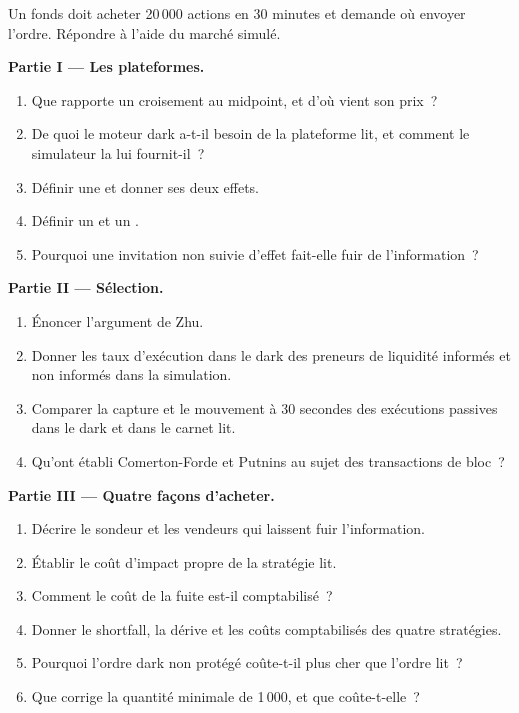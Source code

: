 \begin{problem}\label{pb:mx:dark-pools-and-blocks:1}
Un fonds doit acheter 20\,000 actions en 30 minutes et demande où envoyer l'ordre. Répondre à l'aide du marché simulé.

\medskip\noindent\textbf{Partie I --- Les plateformes.}
\begin{enumerate}
\item Que rapporte un croisement au midpoint, et d'où vient son prix~?
\item De quoi le moteur dark a-t-il besoin de la plateforme lit, et comment le simulateur la lui fournit-il~?
\item Définir une  et donner ses deux effets.
\item Définir un  et un .
\item Pourquoi une invitation non suivie d'effet fait-elle fuir de l'information~?
\end{enumerate}

\medskip\noindent\textbf{Partie II --- Sélection.}
\begin{enumerate}[resume]
\item Énoncer l'argument de Zhu.
\item Donner les taux d'exécution dans le dark des preneurs de liquidité informés et non informés dans la simulation.
\item Comparer la capture et le mouvement à 30 secondes des exécutions passives dans le dark et dans le carnet lit.
\item Qu'ont établi Comerton-Forde et Putnins au sujet des transactions de bloc~?
\end{enumerate}

\medskip\noindent\textbf{Partie III --- Quatre façons d'acheter.}
\begin{enumerate}[resume]
\item Décrire le sondeur et les vendeurs qui laissent fuir l'information.
\item Établir le coût d'impact propre de la stratégie lit.
\item Comment le coût de la fuite est-il comptabilisé~?
\item Donner le shortfall, la dérive et les coûts comptabilisés des quatre stratégies.
\item Pourquoi l'ordre dark non protégé coûte-t-il plus cher que l'ordre lit~?
\item Que corrige la quantité minimale de 1\,000, et que coûte-t-elle~?
\end{enumerate}


\end{problem}
